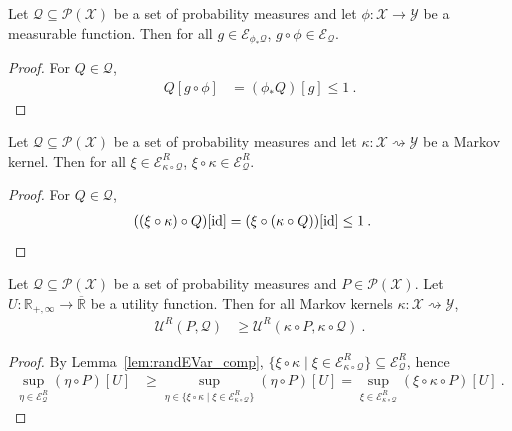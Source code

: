 
\begin{lemma}\label{lem:eVar_comp}
  \leanok
Let $\mathcal{Q} \subseteq \mathcal{P}(\mathcal{X})$ be a set of probability measures and let $\phi : \mathcal{X} \to \mathcal{Y}$ be a measurable function.
Then for all $g \in \mathcal{E}_{\phi_* \mathcal{Q}}$, $g \circ \phi \in \mathcal{E}_{\mathcal{Q}}$.
\end{lemma}

\begin{proof}\leanok
For $Q \in \mathcal{Q}$,
\begin{align*}
  Q[g \circ \phi]
  &= (\phi_* Q)[g]
  \le 1
  \: .
\end{align*}
\end{proof}


\begin{lemma}\label{lem:randEVar_comp}
  \leanok
Let $\mathcal{Q} \subseteq \mathcal{P}(\mathcal{X})$ be a set of probability measures and let $\kappa : \mathcal{X} \rightsquigarrow \mathcal{Y}$ be a Markov kernel.
Then for all $\xi \in \mathcal{E}_{\kappa \circ \mathcal{Q}}^R$, $\xi \circ \kappa \in \mathcal{E}^R_{\mathcal{Q}}$.
\end{lemma}

\begin{proof}\leanok
For $Q \in \mathcal{Q}$,
\begin{align*}
  ((\xi \circ \kappa) \circ Q)[\operatorname{id}]
  &= (\xi \circ (\kappa \circ Q))[\operatorname{id}]
  \le 1
  \: .
\end{align*}
\end{proof}


\begin{theorem}\label{thm:maxRandUtility_comp_le}
  \leanok
Let $\mathcal{Q} \subseteq \mathcal{P}(\mathcal{X})$ be a set of probability measures and $P \in \mathcal{P}(\mathcal{X})$.
Let $U : \mathbb{R}_{+,\infty} \to \overline{\mathbb{R}}$ be a utility function.
Then for all Markov kernels $\kappa : \mathcal{X} \rightsquigarrow \mathcal{Y}$,
\begin{align*}
  \mathcal{U}^R(P, \mathcal{Q})
  &\ge \mathcal{U}^R(\kappa \circ P, \kappa \circ \mathcal{Q})
  \: .
\end{align*}
\end{theorem}

\begin{proof}\leanok
By Lemma~\ref{lem:randEVar_comp}, $\{\xi \circ \kappa \mid \xi \in \mathcal{E}^R_{\kappa \circ \mathcal{Q}}\} \subseteq \mathcal{E}^R_{\mathcal{Q}}$, hence
\begin{align*}
  \sup_{\eta \in \mathcal{E}^R_{\mathcal{Q}}} (\eta \circ P)[U]
  &\ge \sup_{\eta \in \{\xi \circ \kappa \mid \xi \in \mathcal{E}^R_{\kappa \circ \mathcal{Q}}\}} (\eta \circ P)[U]
  = \sup_{\xi \in \mathcal{E}^R_{\kappa \circ \mathcal{Q}}} (\xi \circ \kappa \circ P)[U]
  \: .
\end{align*}
\end{proof}


